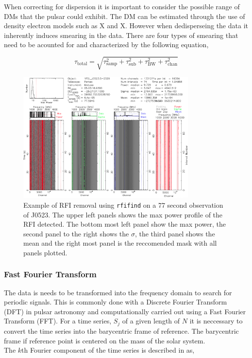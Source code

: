 When correcting for dispersion it is important to consider the possible range of DMs that the pulsar could exhibit. The DM can be estimated through the use of density electron models such as X and X. However when dedisperseing the data it inherently induces smearing in the data. There are four types of smearing that need to be acounted for and characterized by the following equation, 

\begin{equation}
    \tau_{\text{total}} = \sqrt{\tau_{\text{samp}}^2 + \tau_{\text{sub}}^2 + \tau_{\text{BW}}^2 + \tau_{\text{chan}}^2}
\end{equation}



\begin{figure}
    \centering
    \includegraphics[width = 0.8\textwidth]{figs/rfifindexample.png}
    \caption{Example of RFI removal using \texttt{rfifind} on a 77 second observation of J0523. The upper left panels shows the max power profile of the RFI detected. The bottom most left panel show the max power, the second panel to the right shows the $\sigma$, the third panel shows the mean and the right most panel is the reccomended mask with all panels plotted.}
    \label{fig: rfifindexample}
\end{figure}

\subsubsection{Fast Fourier Transform}

The data is needs to be transformed into the frequency domain to search for periodic signals. This is commonly done with a Discrete Fourier Transform (DFT) in pulsar astronomy and computationally carried out using a Fast Fourier Transform (FFT). For a time series, $S_j$ of a given length of $N$ it is neccessary to convert the time series into the barycentric frame of reference. The barycentric frame if reference point is centered on the mass of the solar system. \\ The $k$th Fourier component of the time series is described in \citet[pp.~132-134]{pulsar_handbook} as,

